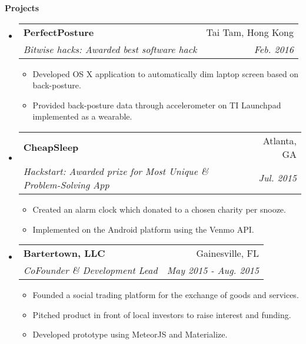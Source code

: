 \documentclass[letterpaper,10pt]{article}
\makeatletter
\newcommand{\resitem}[1]{\item #1 \vspace{-2pt}}
\newcommand{\resheading}[1]{{\large \colorbox{mygrey}{\begin{minipage}{\textwidth}{\textbf{#1 \vphantom{p\^{E}}}}\end{minipage}}}}
\newcommand{\ressubheading}[4]{
\begin{tabular*}{7.0in}{l@{\extracolsep{\fill}}r}
		\textbf{#1} & #2 \\
		\textit{#3} & \textit{#4} \\
\end{tabular*}\vspace{-6pt}}
\makeatother
\begin{document}
\resheading{Projects}
\begin{itemize}
\item
	\ressubheading{PerfectPosture}{Tai Tam, Hong Kong}{Bitwise hacks: Awarded best software hack}{Feb. 2016}
	\begin{itemize}
		\resitem{Developed OS X application to automatically dim laptop screen based on back-posture.}
		\resitem{Provided back-posture data through accelerometer on TI Launchpad implemented as a wearable.}
	\end{itemize}
\item
	\ressubheading{CheapSleep}{Atlanta, GA}{Hackstart: Awarded prize for Most Unique \& Problem-Solving App}{Jul. 2015}
	\begin{itemize}
		\resitem{Created an alarm clock which donated to a chosen charity per snooze.}
		\resitem{Implemented on the Android platform using the Venmo API.}
	\end{itemize}
\item
	\ressubheading{Bartertown, LLC}{Gainesville, FL}{CoFounder \& Development Lead}{May 2015 - Aug. 2015}
	\begin{itemize}
		\resitem{Founded a social trading platform for the exchange of goods and services.}
		\resitem{Pitched product in front of local investors to raise interest and funding.}
		\resitem{Developed prototype using MeteorJS and Materialize.}
	\end{itemize}

\end{itemize}

\end{document}
